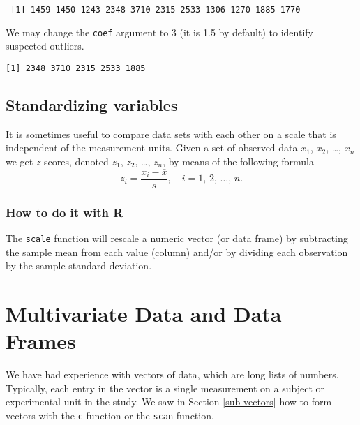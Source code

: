 \documentclass[]{book}
\newenvironment{Shaded}{\begin{snugshade}}{\end{snugshade}}
\newcommand{\KeywordTok}[1]{\textcolor[rgb]{0.13,0.29,0.53}{\textbf{{#1}}}}
\newcommand{\DataTypeTok}[1]{\textcolor[rgb]{0.13,0.29,0.53}{{#1}}}
\newcommand{\DecValTok}[1]{\textcolor[rgb]{0.00,0.00,0.81}{{#1}}}
\newcommand{\NormalTok}[1]{{#1}}
\numberwithin{equation}{chapter}
\numberwithin{figure}{chapter}
\theoremstyle{plain}
\theoremstyle{definition}
\theoremstyle{remark}
\theoremstyle{definition}
\theoremstyle{definition}
\theoremstyle{remark}
\begin{document}
\begin{verbatim}
 [1] 1459 1450 1243 2348 3710 2315 2533 1306 1270 1885 1770
\end{verbatim}

We may change the \texttt{coef} argument to 3 (it is 1.5 by default) to
identify suspected outliers.

\begin{Shaded}
\end{Shaded}

\begin{verbatim}
[1] 2348 3710 2315 2533 1885
\end{verbatim}

\subsection{Standardizing variables}\label{standardizing-variables}

It is sometimes useful to compare data sets with each other on a scale
that is independent of the measurement units. Given a set of observed
data \(x_{1}\), \(x_{2}\), \ldots{}, \(x_{n}\) we get \(z\) scores,
denoted \(z_{1}\), \(z_{2}\), \ldots{}, \(z_{n}\), by means of the
following formula \[ z_{i}=\frac{x_{i}-\overline{x}}{s},\quad
i=1,\,2,\,\ldots,\, n.  \]

\subsubsection{How to do it with R}\label{how-to-do-it-with-r-7}

The \texttt{scale} function will rescale a numeric vector (or data
frame) by subtracting the sample mean from each value (column) and/or by
dividing each observation by the sample standard deviation.

\section{Multivariate Data and Data Frames}\label{sec-multivariate-data}

We have had experience with vectors of data, which are long lists of
numbers. Typically, each entry in the vector is a single measurement on
a subject or experimental unit in the study. We saw in Section
\ref{sub-vectors} how to form vectors with the \texttt{c} function or
the \texttt{scan} function.
\end{document}
